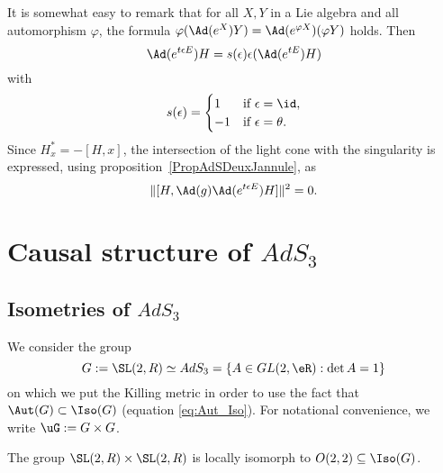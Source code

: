 It is somewhat easy to remark that for all $X,Y$ in a Lie algebra and all automorphism $\varphi$, the formula $\varphi(\Ad(e^X)Y)=\Ad(e^{\varphi X})(\varphi Y)$ holds. Then
\begin{equation}
	\Ad(e^{t\epsilon E})H=s(\epsilon)\epsilon(\Ad(e^{tE})H)
\end{equation}
with
\[
	s(\epsilon)=
	\begin{cases}
		1  & \text{if }\epsilon=\id,    \\
		-1 & \text{if }\epsilon=\theta.
	\end{cases}
\]
Since $H^*_x=-[H,x]$, the intersection of the light cone with the singularity is expressed, using proposition~\ref{PropAdSDeuxJannule}, as
\begin{equation}
	\|[H,\Ad(g)\Ad(e^{t\epsilon E})H]\|^2=0.
\end{equation}

\section{Causal structure of \texorpdfstring{$AdS_3$}{AdS3}}

\subsection{Isometries of \texorpdfstring{$AdS_3$}{AdS3}}

We consider the group
\[
	G:=\SL(2,R)\simeq AdS_3=\{A\in GL(2,\eR):\det A=1\}
\]
on which we put the Killing metric in order to use the fact that $\Aut(G)\subset\Iso(G)$ (equation \eqref{eq:Aut_Iso}). For notational convenience, we write $\uG:=G\times G$.

\begin{lemma}
	The group $\SL(2,R)\times\SL(2,R)$ is locally isomorph to $O(2,2)\subseteq \Iso(G)$.
\end{lemma}

